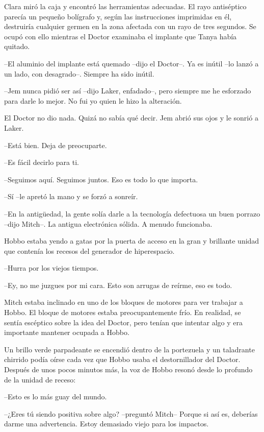 {Clara miró la caja y encontró las herramientas adecuadas. El rayo
 antiséptico parecía un pequeño bolígrafo y, según las instrucciones
 imprimidas en él, destruiría cualquier germen en la zona afectada con un
 rayo de tres segundos. Se ocupó con ello mientras el Doctor examinaba el
implante que Tanya había quitado.}

{--El aluminio del implante está quemado --dijo el Doctor--. Ya es inútil
--lo lanzó a un lado, con desagrado--. Siempre ha sido inútil.}

{--Jem nunca pidió ser así --dijo Laker, enfadado--, pero siempre me he
esforzado para darle lo mejor. No fui yo quien le hizo la alteración.}

{El Doctor no dio nada. Quizá no sabía qué decir. Jem abrió sus ojos y le
sonrió a Laker.}

{--Está bien. Deja de preocuparte.}

{--Es fácil decirlo para ti.}

{--Seguimos aquí. Seguimos juntos. Eso es todo lo que importa.}

{--Sí --le apretó la mano y se forzó a sonreír.}

{--En la
 antigüedad, la gente solía darle a la tecnología defectuosa un buen
 porrazo --dijo Mitch--. La antigua electrónica sólida. A menudo
funcionaba.}

{Hobbo estaba yendo a gatas por la puerta de acceso en la gran y
 brillante unidad que contenía los recesos del generador de
hiperespacio.}

{--Hurra por los viejos tiempos.}

{--Ey, no me juzgues por mi cara. Esto son arrugas de reírme, eso es
todo.}

{Mitch estaba inclinado en uno de los bloques de motores para ver
 trabajar a Hobbo. El bloque de motores estaba preocupantemente frío. En
 realidad, se sentía escéptico sobre la idea del Doctor, pero tenían que
intentar algo y era importante mantener ocupada a Hobbo.}

{Un brillo verde parpadeante se encendió dentro de la portezuela y un
 taladrante chirrido podía oírse cada vez que Hobbo usaba el
 destornillador del Doctor. Después de unos pocos minutos más, la voz de
Hobbo resonó desde lo profundo de la unidad de receso:}

{--Esto es lo más guay del mundo.}

{--¿Eres tú siendo positiva sobre algo? --preguntó Mitch-- Porque si así
 es, deberías darme una advertencia. Estoy demasiado viejo para los
impactos.}

